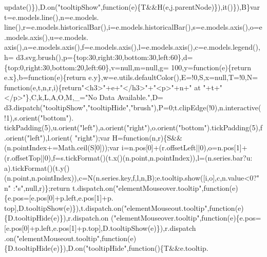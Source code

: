 \begin{DoxyCode}
{      update()\}),D.on(\textcolor{stringliteral}{"tooltipShow"},\textcolor{keyword}{function}(e)\{T&&H(e,j.parentNode)\}),it()\}),B\}var t=e.models.line(),n=e.models.
      line(),r=e.models.historicalBar(),i=e.models.historicalBar(),s=e.models.axis(),o=e.models.axis(),u=e.models.
      axis(),a=e.models.axis(),f=e.models.axis(),l=e.models.axis(),c=e.models.legend(),h=
      d3.svg.brush(),p=\{top:30,right:30,bottom:30,left:60\},d=\{top:0,right:30,bottom:20,left:60\},v=null,m=null,g=
      100,y=\textcolor{keyword}{function}(e)\{\textcolor{keywordflow}{return} e.x\},b=\textcolor{keyword}{function}(e)\{\textcolor{keywordflow}{return} e.y\},w=e.utils.defaultColor(),E=!0,S,x=null,T=!0,N=\textcolor{keyword}{
      function}(e,t,n,r,i)\{\textcolor{keywordflow}{return}\textcolor{stringliteral}{"<h3>"}+e+\textcolor{stringliteral}{"</h3>"}+\textcolor{stringliteral}{"<p>"}+n+\textcolor{stringliteral}{" at "}+t+\textcolor{stringliteral}{"</p>"}\},C,k,L,A,O,M,\_=\textcolor{stringliteral}{"No Data Available."},D=
      d3.dispatch(\textcolor{stringliteral}{"tooltipShow"},\textcolor{stringliteral}{"tooltipHide"},\textcolor{stringliteral}{"brush"}),P=0;t.clipEdge(!0),n.interactive(!1),s.orient(\textcolor{stringliteral}{"bottom"}).
      tickPadding(5),u.orient(\textcolor{stringliteral}{"left"}),a.orient(\textcolor{stringliteral}{"right"}),o.orient(\textcolor{stringliteral}{"bottom"}).tickPadding(5),f.orient(\textcolor{stringliteral}{"left"}),l.orient(\textcolor{stringliteral}{
      "right"});var H=\textcolor{keyword}{function}(n,r)\{S&&(n.pointIndex+=Math.ceil(S[0]));var i=n.pos[0]+(r.offsetLeft||0),o=n.pos[1]+
      (r.offsetTop||0),f=s.tickFormat()(t.x()(n.point,n.pointIndex)),l=(n.series.bar?u:
      a).tickFormat()(t.y()(n.point,n.pointIndex)),c=N(n.series.key,f,l,n,B);e.tooltip.show([i,o],c,n.value<0?\textcolor{stringliteral}{"n"}
      :\textcolor{stringliteral}{"s"},null,r)\};\textcolor{keywordflow}{return} t.dispatch.on(\textcolor{stringliteral}{"elementMouseover.tooltip"},\textcolor{keyword}{function}(e)\{e.pos=[e.pos[0]+p.left,e.pos[1]+p.
      top],D.tooltipShow(e)\}),t.dispatch.on(\textcolor{stringliteral}{"elementMouseout.tooltip"},\textcolor{keyword}{function}(e)\{D.tooltipHide(e)\}),r.dispatch.on
      (\textcolor{stringliteral}{"elementMouseover.tooltip"},\textcolor{keyword}{function}(e)\{e.pos=[e.pos[0]+p.left,e.pos[1]+p.top],D.tooltipShow(e)\}),r.dispatch
      .on(\textcolor{stringliteral}{"elementMouseout.tooltip"},\textcolor{keyword}{function}(e)\{D.tooltipHide(e)\}),D.on(\textcolor{stringliteral}{"tooltipHide"},\textcolor{keyword}{function}()\{T&&e.tooltip.
}
\end{DoxyCode}
